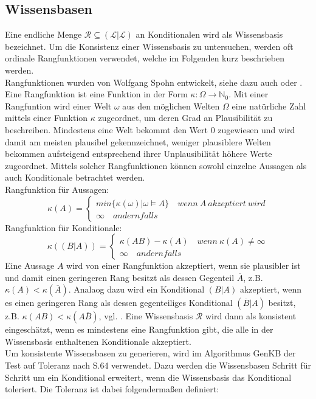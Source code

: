 \documentclass[12pt,a4paper]{article}
\newcommand{\lag}{\mathcal{L}}
\begin{document}
\subsection{Wissensbasen}
\label{wissensbasen}
Eine endliche Menge $\mathcal{R} \subseteq (\lag | \lag)$ an Konditionalen wird als Wissensbasis bezeichnet. Um die Konsistenz einer Wissensbasis zu untersuchen, werden oft ordinale Rangfunktionen verwendet, welche im Folgenden kurz beschrieben werden. \\
Rangfunktionen wurden von Wolfgang Spohn entwickelt, siehe dazu auch \cite{spohn88} oder \cite{spohn12}. Eine Rangfunktion ist eine Funktion in der Form $\kappa :  \Omega \rightarrow \mathbb{N}_0 $. Mit einer Rangfuntion wird einer Welt $\omega$ aus den möglichen Welten $\Omega$ eine natürliche Zahl mittels einer Funktion $\kappa$ zugeordnet, um deren Grad an Plausibilität zu beschreiben. Mindestens eine Welt bekommt den Wert 0 zugewiesen und wird damit am meisten plausibel gekennzeichnet, weniger plausiblere Welten bekommen aufsteigend entsprechend ihrer Unplausibilität höhere Werte zugeordnet. Mittels solcher Rangfunktionen können sowohl einzelne Aussagen als auch Konditionale betrachtet werden.\\
Rangfunktion für Aussagen:
\[
 \kappa(A)=\begin{cases}
			min\{\kappa(\omega)|\omega \models A \} \quad wenn \  A \ akzeptiert \ wird \\
			\infty \quad andernfalls
            \end{cases}
\]
Rangfunktion für Konditionale:
\[
\kappa((B|A))=\begin{cases}
			\kappa(AB) - \kappa(A) \quad wenn \ \kappa(A) \neq \infty \\
			\infty \quad andernfalls
            \end{cases}
\]
Eine Aussage $A$ wird von einer Rangfunktion akzeptiert, wenn sie plausibler ist und damit einen geringeren Rang besitzt als dessen Gegenteil $\overline{A}$, z.B. $\kappa(A) < \kappa(\overline{A})$. Analaog dazu wird ein Konditional $(B|A)$ akzeptiert, wenn es einen geringeren Rang als dessen gegenteiliges Konditional $(\overline{B}|A)$ besitzt, z.B. $\kappa(AB)<\kappa(A\overline{B})$, vgl. \cite{beierle17}. Eine Wissensbasis $\mathcal{R}$ wird dann als konsistent eingeschätzt, wenn es mindestens eine Rangfunktion gibt, die alle in der Wissensbasis enthaltenen Konditionale akzeptiert.\\
Um konsistente Wissensbasen zu generieren, wird im Algorithmus GenKB der Test auf Toleranz nach \cite{goldszmidt96}S.64 verwendet. Dazu werden die Wissensbasen Schritt für Schritt um ein Konditional erweitert, wenn die Wissensbasis das Konditional toleriert. Die Toleranz ist dabei folgendermaßen definiert:
\end{document}
